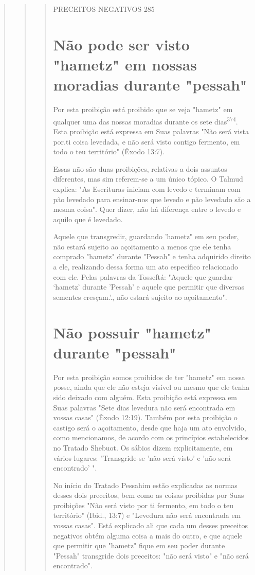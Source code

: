 \begin{quote}
\begin{quote}
\begin{quote}
PRECEITOS NEGATIVOS 285

\section{Não pode ser visto "hametz" em nossas moradias durante "pessah"}

Por esta proibição está proibido que se veja "hametz" em qualquer uma
das nossas moradias durante os sete dias\textsuperscript{374}. Esta
proibição está expressa em Suas palavras "Não será vista por.ti coisa
levedada, e não será visto contigo fermento, em todo o teu território"
(Êxodo 13:7).

Essas não são duas proibições, relativas a dois assuntos diferentes, mas
sim referem-se a um único tópico. O Talmud explica: "As Escrituras
ini­ciam com levedo e terminam com pão levedado para ensinar-nos que
levedo e pão levedado são a mesma coisa". Quer dizer, não há diferença
entre o leve­do e aquilo que é levedado.

Aquele que transgredir, guardando 'hametz" em seu poder, não es­tará
sujeito ao açoitamento a menos que ele tenha comprado "hametz" duran­te
"Pessah" e tenha adquirido direito a ele, realizando dessa forma um ato
es­pecífico relacionado com ele. Pelas palavras da Tosseftá: "Aquele que
guardar `hametz' durante 'Pessah' e aquele que permitir que diversas
sementes cresçam.'., não estará
sujeito ao açoitamento".


\section{Não possuir "hametz" durante "pessah"}

Por esta proibição somos proibidos de ter "hametz" em nossa pos­se,
ainda que ele não esteja visível ou mesmo que ele tenha sido deixado com
alguém. Esta proibição está expressa em Suas palavras "Sete dias
levedura não será encontrada em vossas casas" (Êxodo 12:19). Também por
esta proibição o castigo será o açoitamento, desde que haja um ato
envolvido, como mencio­namos, de acordo com os princípios estabelecidos
no Tratado Shebuot. Os sá­bios dizem explicitamente, em vários lugares:
"Transgride-se 'não será visto' e 'não será encontrado' ".

No início do Tratado Pessahim estão explicadas as normas desses dois
preceitos, bem como as coisas proibidas por Suas proibições "Não será
visto por ti fermento, em todo o teu território" (Ibid., 13:7) e
"Levedura não será encontrada em vossas casas". Está explicado ali que
cada um desses preceitos negativos obtém alguma coisa a mais do outro, e
que aquele que permitir que "hametz" fique em seu poder durante "Pessah"
transgride dois preceitos: "não será visto" e "não será encontrado".
\end{quote}


\end{quote}
\end{quote}
